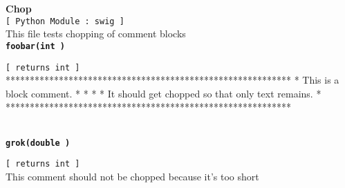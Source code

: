 \setlength{\parindent}{0.0in}
\setlength{\textwidth}{6.5in}
\setlength{\oddsidemargin}{0.0in}
\pagestyle{headings}

{\Large \bf  Chop }\\
{\tt [ Python Module : swig ]  }\\
   This file tests chopping of comment blocks   
\\{\tt \bf foobar(int ) }
\\
\makebox[0.5in]{}\begin{minipage}[t]{6in}
{\tt [ returns int  ]  }\\
  ***********************************************************
 * This is a block comment.                                 *
 *                                                          *
 * It should get chopped so that only text remains.         *
 ***********************************************************  
\\

\end{minipage}\\

{\tt \bf grok(double ) }
\\
\makebox[0.5in]{}\begin{minipage}[t]{6in}
{\tt [ returns int  ]  }\\
   This comment should not be chopped because it's too short   
\\

\end{minipage}\\




